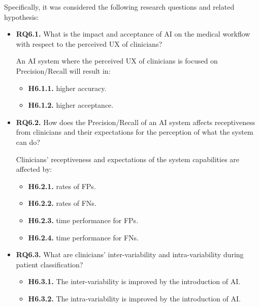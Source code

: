 \noindent
Specifically, it was considered the following research questions and related hypothesis:

\begin{itemize}
\item {\bf RQ6.1.} What is the impact and acceptance of \ac{AI} on the medical workflow with respect to the perceived \ac{UX} of clinicians?

An AI system where the perceived \ac{UX} of clinicians is focused on Precision/Recall will result in:

\begin{itemize}
\item {\bf H6.1.1.} higher accuracy.
\item {\bf H6.1.2.} higher acceptance.
\end{itemize}
\item {\bf RQ6.2.} How does the Precision/Recall of an \ac{AI} system affects receptiveness from clinicians and their expectations for the perception of what the system can do?

Clinicians' receptiveness and expectations of the system capabilities are affected by:

\begin{itemize}
\item {\bf H6.2.1.} rates of \acp{FP}.
\item {\bf H6.2.2.} rates of \acp{FN}.
\item {\bf H6.2.3.} time performance for \acp{FP}.
\item {\bf H6.2.4.} time performance for \acp{FN}.
\end{itemize}
\item {\bf RQ6.3.} What are clinicians' inter-variability and intra-variability during patient classification?
\begin{itemize}
\item {\bf H6.3.1.} The inter-variability is improved by the introduction of \ac{AI}.
\item {\bf H6.3.2.} The intra-variability is improved by the introduction of \ac{AI}.
\end{itemize}
\end{itemize}

\hfill

